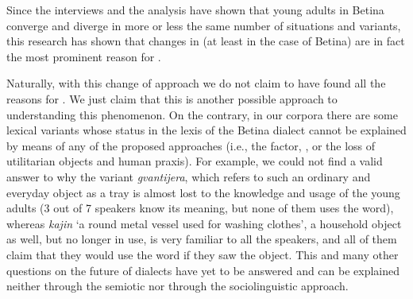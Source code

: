 \documentclass[output=paper]{LSP/langsci}
\begin{document}
Since the interviews and the analysis have shown that young adults in Betina converge and diverge in more or less the same number of situations and variants, this research has shown that changes in  (at least in the case of Betina) are in fact the most prominent reason for . 

Naturally, with this change of approach we do not claim to have found all the reasons for . We just claim that this is another possible approach to understanding this phenomenon. On the contrary, in our corpora there are some lexical variants whose status in the lexis of the Betina dialect cannot be explained by means of any of the proposed approaches (i.e., the  factor, , or the loss of utilitarian objects and human praxis). For example, we could not find a valid answer to why the variant \textit{gvantijera}, which refers to such an ordinary and everyday object as a tray is almost lost to the knowledge and usage of the young adults (3 out of 7 speakers know its meaning, but none of them uses the word), whereas \textit{kajin} ‘a round metal vessel used for washing clothes’, a household object as well, but no longer in use, is very familiar to all the speakers, and all of them claim that they would use the word if they saw the object. This and many other questions on the future of dialects have yet to be answered and can be explained neither through the semiotic nor through the sociolinguistic approach.

\printbibliography[heading=subbibliography,notkeyword=this]
\end{document}
